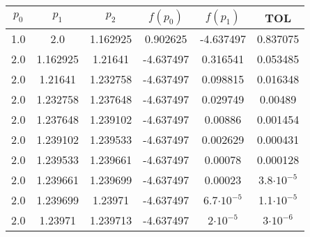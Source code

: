 \documentclass[12pt]{article}
\begin{document}
\begin{enumerate}
    \begin{center}
        \begin{tabular}{|c|c|c|c|c|c|}
        \hline
        \(p_0\) & \(p_1\)& \(p_2\)&\(f(p_0)\) & \(f(p_1)\) & \textbf{TOL} \\
        \hline
        1.0 & 2.0 & 1.162925 & 0.902625 & -4.637497 &  0.837075 \\
        2.0 & 1.162925 & 1.21641 & -4.637497 & 0.316541 &  0.053485 \\
        2.0 & 1.21641 & 1.232758 & -4.637497 & 0.098815 &  0.016348 \\
        2.0 & 1.232758 & 1.237648 & -4.637497 & 0.029749 &  0.00489 \\
        2.0 & 1.237648 & 1.239102 & -4.637497 & 0.00886 &  0.001454 \\
        2.0 & 1.239102 & 1.239533 & -4.637497 & 0.002629 &  0.000431 \\
        2.0 & 1.239533 & 1.239661 & -4.637497 & 0.00078 &  0.000128 \\
        2.0 & 1.239661 & 1.239699 & -4.637497 & 0.00023 &  3.8\(\cdot 10^{-5}\) \\
        2.0 & 1.239699 & 1.23971 & -4.637497 & 6.7\(\cdot 10^{-5}\) &  1.1\(\cdot 10^{-5}\) \\
        2.0 & 1.23971 & 1.239713 & -4.637497 & 2\(\cdot 10^{-5}\) &  3\(\cdot 10^{-6}\) \\
        \hline 
        \end{tabular}
    \end{center}
    

\end{enumerate}
\end{document}
